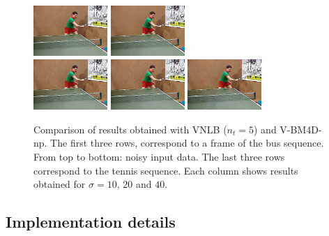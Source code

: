 \documentclass[10pt, journal, twocolumn, final, a4paper]{IEEEtran}
\begin{document}
\begin{figure}[thpb!]
\begin{center}
		\includegraphics[trim=3.5cm 2.0cm 1.5cm 0.5cm, clip=true, width=0.25\textwidth]{figs/tennis_vnlb_s20_tr2_140.png}
		\includegraphics[trim=3.5cm 2.0cm 1.5cm 0.5cm, clip=true, width=0.25\textwidth]{figs/tennis_vnlb_s40_tr2_140.png}\\
		\includegraphics[trim=3.5cm 2.0cm 1.5cm 0.5cm, clip=true, width=0.25\textwidth]{figs/tennis_s10_bm4d_140.png}
		\includegraphics[trim=3.5cm 2.0cm 1.5cm 0.5cm, clip=true, width=0.25\textwidth]{figs/tennis_s20_bm4d_140.png}
		\includegraphics[trim=3.5cm 2.0cm 1.5cm 0.5cm, clip=true, width=0.25\textwidth]{figs/tennis_s40_bm4d_140.png}
	\end{center}
	\caption{Comparison of results obtained with VNLB ($n_t =5$) and V-BM4D-np.
	The first three rows, correspond to a frame of the bus sequence. From top to
	bottom: noisy input data. The last three rows correspond to the tennis sequence.
	Each column shows results obtained for $\sigma = 10$, $20$ and $40$.}
	\label{fig:results}
\end{figure}

\subsection{Implementation details}
\end{document}
